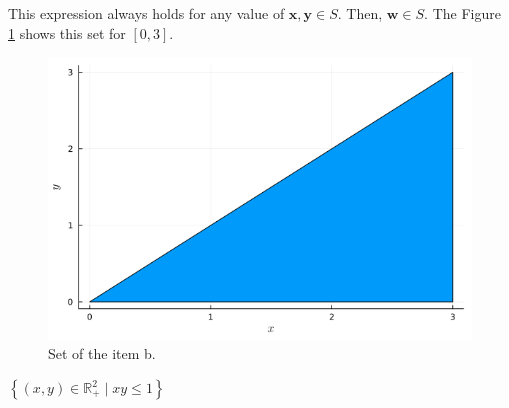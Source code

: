 \documentclass[12pt,a4paper]{article}
\begin{document}
This expression always holds for any value of \(\mathbf{x}, \mathbf{y} \in S\). Then, \(\mathbf{w} \in S\). The Figure \ref{fig:2.8b} shows this set for \([0, 3]\).
\begin{figure}[H]
    \centering
    \includegraphics[scale=0.3]{figs/2.8b.png}
    \caption{Set of the item b.}
    \label{fig:2.8b}
\end{figure}

\subproblem \(\left\{ (x,y) \in \mathbb{R}_{+}^{2} \mid xy \leq 1 \right\}\)

\subanswer
\end{document}
